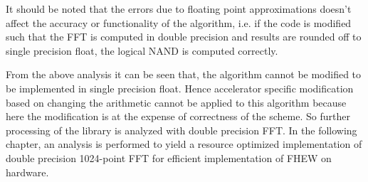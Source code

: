 It should be noted that the errors due to floating point approximations doesn't affect the accuracy or functionality of the algorithm, i.e. if the code is modified such that the FFT is computed in double precision and results are rounded off to single precision float, the logical NAND is computed correctly.

\vspace{0.25cm}
\noindent From the above analysis it can be seen that, the algorithm cannot be modified to be implemented in single precision float. Hence accelerator specific modification based on changing the arithmetic cannot be applied to this algorithm because here the modification is at the expense of correctness of the scheme. So further processing of the library is analyzed with double precision FFT. In the following chapter, an analysis is performed to yield a resource optimized implementation of double precision 1024-point FFT for efficient implementation of FHEW on hardware.



